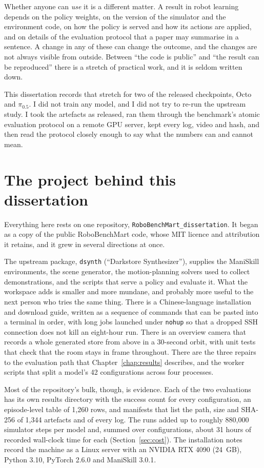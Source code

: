 Whether anyone can \emph{use} it is a different matter. A result in robot learning depends on the policy weights, on the version of the simulator and the environment code, on how the policy is served and how its actions are applied, and on details of the evaluation protocol that a paper may summarise in a sentence. A change in any of these can change the outcome, and the changes are not always visible from outside. Between ``the code is public'' and ``the result can be reproduced'' there is a stretch of practical work, and it is seldom written down.

This dissertation records that stretch for two of the released checkpoints, Octo and $\pi_{0.5}$. I did not train any model, and I did not try to re-run the upstream study. I took the artefacts as released, ran them through the benchmark's atomic evaluation protocol on a remote GPU server, kept every log, video and hash, and then read the protocol closely enough to say what the numbers can and cannot mean.

\section{The project behind this dissertation}

Everything here rests on one repository, \texttt{RoboBenchMart\_dissertation}. It began as a copy of the public RoboBenchMart code, whose MIT licence and attribution it retains, and it grew in several directions at once.

The upstream package, \texttt{dsynth} (``Darkstore Synthesizer''), supplies the ManiSkill environments, the scene generator, the motion-planning solvers used to collect demonstrations, and the scripts that serve a policy and evaluate it. What the workspace adds is smaller and more mundane, and probably more useful to the next person who tries the same thing. There is a Chinese-language installation and download guide, written as a sequence of commands that can be pasted into a terminal in order, with long jobs launched under \texttt{nohup} so that a dropped SSH connection does not kill an eight-hour run. There is an overview camera that records a whole generated store from above in a 30-second orbit, with unit tests that check that the room stays in frame throughout. There are the three repairs to the evaluation path that Chapter~\ref{chap:results} describes, and the worker scripts that split a model's 42 configurations across four processes.

Most of the repository's bulk, though, is evidence. Each of the two evaluations has its own results directory with the success count for every configuration, an episode-level table of 1,260 rows, and manifests that list the path, size and SHA-256 of 1,344 artefacts and of every log. The runs added up to roughly 880,000 simulator steps per model and, summed over configurations, about 31 hours of recorded wall-clock time for each (Section~\ref{sec:cost}). The installation notes record the machine as a Linux server with an NVIDIA RTX 4090 (24~GB), Python 3.10, PyTorch 2.6.0 and ManiSkill 3.0.1.

